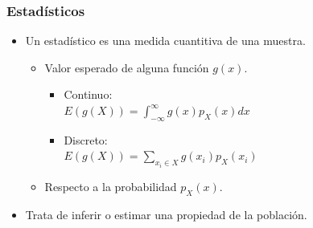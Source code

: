 

\begin{frame}\frametitle{Estadísticos}
    \begin{itemize}
      \item Un \alert{estadístico} es una medida cuantitiva de una muestra.
      \begin{itemize}
        \item Valor esperado de alguna función $g(x)$.
        \begin{itemize}
          \vspace{0.1cm}
          \item \alert{Continuo:} \hspace{0.1cm}\\\vspace{0.1cm}$E(g(X))=\int_{-\infty}^{\infty}g(x) p_X(x)dx$
          \vspace{0.1cm}
          \item \alert{Discreto:}\\\vspace{0.1cm}$E(g(X))=\sum_{x_i \in X} g(x_i)p_X(x_i)$
        \end{itemize}
      \item Respecto a la probabilidad $p_X(x)$.
      \end{itemize}
      \item Trata de inferir o estimar una propiedad de la población.
    \end{itemize}
    \footnotesize
\end{frame}
  

